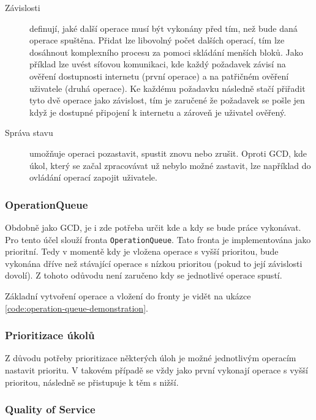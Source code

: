 \begin{description}
  \item[Závislosti] definují, jaké další operace musí být vykonány před tím, než bude daná operace spuštěna.
  Přidat lze libovolný počet dalších operací, tím lze dosáhnout komplexního procesu za pomoci skládání menších bloků.
  Jako příklad lze uvést síťovou komunikaci, kde každý požadavek závisí na ověření dostupnosti internetu (první operace) a na patřičném ověření uživatele (druhá operace).
  Ke každému požadavku následně stačí přiřadit tyto dvě operace jako závislost, tím je zaručené že požadavek se pošle jen když je dostupné připojení k internetu a zároveň je uživatel ověřený.
  \item[Správa stavu] umožňuje operaci pozastavit, spustit znovu nebo zrušit.
  Oproti GCD, kde úkol, který se začal zpracovávat už nebylo možné zastavit, lze například do ovládání operací zapojit uživatele.
\end{description}

\subsubsection*{OperationQueue}

Obdobně jako GCD, je i zde potřeba určit kde a kdy se bude práce vykonávat.
Pro tento účel slouží fronta \texttt{OperationQueue}.
Tato fronta je implementována jako prioritní.
Tedy v momentě kdy je vložena operace s vyšší prioritou, bude vykonána dříve než stávající operace s nízkou prioritou (pokud to její závislosti dovolí).
Z tohoto odůvodu není zaručeno kdy se jednotlivé operace spustí.

Základní vytvoření operace a vložení do fronty je vidět na ukázce \ref{code:operation-queue-demonstration}.


\subsubsection*{Prioritizace úkolů}

Z důvodu potřeby prioritizace některých úloh je možné jednotlivým operacím nastavit prioritu.
V takovém případě se vždy jako první vykonají operace s vyšší prioritou, následně se přistupuje k těm s nižší.

\subsubsection*{Quality of Service}


